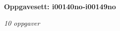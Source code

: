 \centerline{\bf Oppgavesett: i00140no-i00149no}
\vskip 10pt
\centerline{\it 10 oppgaver}\vskip 10pt
\vskip 10pt
